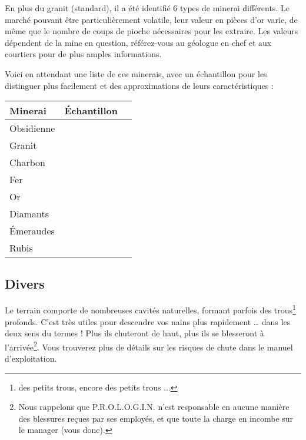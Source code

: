  En plus du granit (standard), il a été identifié 6 types de minerai
  différents.  Le marché pouvant être particulièrement volatile, leur valeur en
  pièces d'or varie, de même que le nombre de coups de pioche nécessaires pour
  les extraire. Les valeurs dépendent de la mine en question, référez-vous au
  géologue en chef et aux courtiers pour de plus amples informations.

  Voici en attendant une liste de ces minerais, avec un échantillon pour les
  distinguer plus facilement et des approximations de leurs caractéristiques :
  \begin{center}
    \begin{tabular}{|l|Sc|}
      \hline
      Minerai & Échantillon \\
      \hline
      Obsidienne &  \\
      \hline
      Granit &  \\
      \hline
      Charbon &  \\
      \hline
      Fer &  \\
      \hline
      Or &  \\
      \hline
      Diamants &  \\
      \hline
      Émeraudes &  \\
      \hline
      Rubis &  \\
      \hline
    \end{tabular}
  \end{center}

\subsection{Divers}

  Le terrain comporte de nombreuses cavités naturelles, formant parfois des
  trous\footnote{des petits trous, encore des petits trous ...} profonds. C'est
  très utiles pour descendre vos nains plus rapidement \ldots{} dans les
  deux sens du termes ! Plus ils chuteront de haut, plus ils se blesseront à
  l'arrivée\footnote{Nous rappelons que P.R.O.L.O.G.I.N. n'est responsable en aucune
  manière des blessures reçues par ses employés, et que toute la charge en
  incombe sur le manager (vous donc).}. Vous trouverez plus de détails
  sur les risques de chute dans le manuel d'exploitation.

